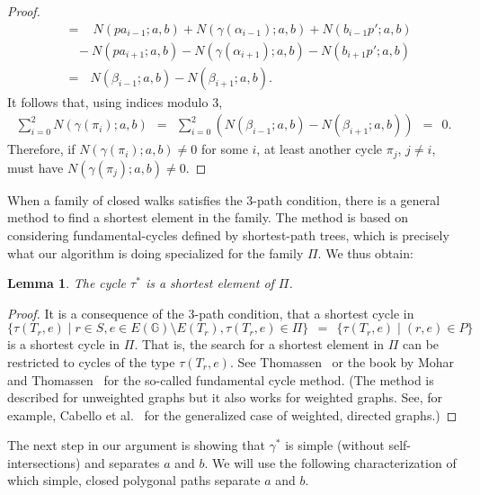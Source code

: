 \documentclass[11pt,a4paper]{article}
\newtheorem{lemma}[definition]{Lemma}
\def\I{\ensuremath{\mathbb{G}}}
\def\cycle{\ensuremath{\tau}}
\begin{document}
\begin{proof}
\begin{align*}
							&=~~~~ N(p a_{i-1};a,b) + N(\gamma(\alpha_{i-1}) ;a,b) + N(b_{i-1}p';a,b) \\
							& ~~~~ - N(p a_{i+1} ;a,b) - N(\gamma(\alpha_{i+1});a,b) - N( b_{i+1}p';a,b)\\
							&=~~~ N(\beta_{i-1};a,b)- N(\beta_{i+1};a,b).
	\end{align*}
	It follows that, using indices modulo $3$,
	\begin{align*}
		\sum_{i=0}^2 N(\gamma(\pi_i);a,b) 
			~~=~~ \sum_{i=0}^2\left(N(\beta_{i-1};a,b) - N(\beta_{i+1};a,b) \right)
			~~=~~ 0. 
	\end{align*}
	Therefore, if $N(\gamma(\pi_i);a,b)\not= 0$ for some $i$, at least another cycle $\pi_j$, $j\not= i$,
	must have $N(\gamma(\pi_j);a,b)\not= 0$.\qedhere
\end{proof}

When a family of closed walks satisfies the 3-path condition, there is a general method to find a shortest element in the family.
The method is based on considering fundamental-cycles defined by shortest-path trees, which is
precisely what our algorithm is doing specialized for the family $\Pi$. 
We thus obtain:

\begin{lemma}\label{le:shortest}
	The cycle $\tau^*$ is a shortest element of $\Pi$.
\end{lemma}
\begin{proof}
It is a consequence of the 3-path condition, 
	that a shortest cycle in 
	\[
		\{ \cycle(T_r,e)\mid r\in S, e\in E(\I)\setminus E(T_r), \cycle(T_r,e)\in \Pi \} 
		~~=~~ 
		\{ \cycle(T_r,e)\mid (r,e)\in P \} 
	\]
	is a shortest cycle in $\Pi$. That is, the search for a shortest element in $\Pi$
	can be restricted to cycles of the type $\cycle(T_r,e)$.
	See Thomassen~\cite{t-egsnc-90} or the book by Mohar and Thomassen~\cite[Chapter 4]{mt-gs-01} 
	for the so-called fundamental cycle method. 
	(The method is described for unweighted graphs but it also works for weighted graphs.
	See, for example, Cabello et al.~\cite{ccl-fsntc-10} for the generalized case of weighted, directed graphs.)
\end{proof}

The next step in our argument is showing that $\gamma^*$ is simple (without self-intersections) 
and separates $a$ and $b$.
We will use the following characterization of which simple, closed  
polygonal paths separate $a$ and $b$. 
\end{document}
